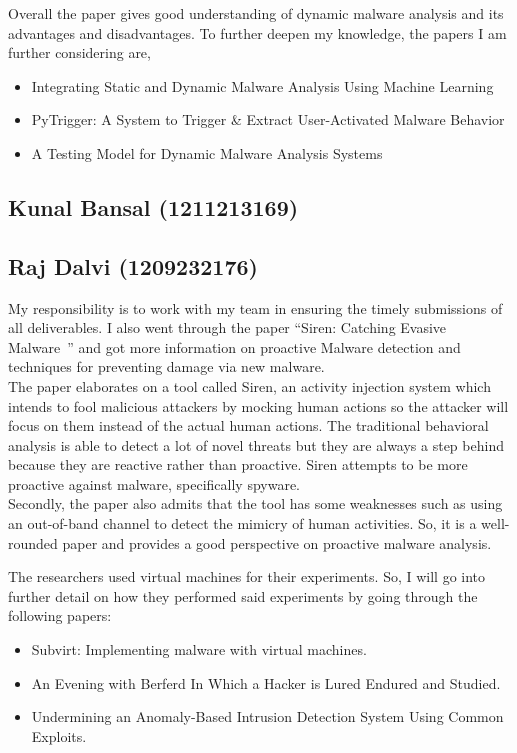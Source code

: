 \documentclass[16pt]{article}
\begin{document}
		Overall the paper gives good understanding of dynamic malware analysis and its advantages and disadvantages. To further deepen my knowledge, the papers I am further considering are,
		\begin{itemize}
			\item Integrating Static and Dynamic Malware Analysis Using Machine Learning~\cite{mangialardo2015integrating}
			\item PyTrigger: A System to Trigger \& Extract User-Activated Malware Behavior~\cite{fleck2013pytrigger}
			\item A Testing Model for Dynamic Malware Analysis Systems~\cite{massicotte2012testing}
		\end{itemize}
		
		\subsection{Kunal Bansal (1211213169)}
		\subsection{Raj Dalvi (1209232176)}
		My responsibility is to work with my team in ensuring the timely submissions of all deliverables. I also went through the paper “Siren: Catching Evasive Malware~\cite{borders2006siren}” and got more information on proactive Malware detection and techniques for preventing damage via new malware.\\
		The paper elaborates on a tool called Siren, an activity injection system which intends to fool malicious attackers by mocking human actions so the attacker will focus on them instead of the actual human actions. The traditional behavioral analysis is able to detect a lot of novel threats but they are always a step behind because they are reactive rather than proactive. Siren attempts to be more proactive against malware, specifically spyware.\\
		Secondly, the paper also admits that the tool has some weaknesses such as using an out-of-band channel to detect the mimicry of human activities. So, it is a well-rounded paper and provides a good perspective on proactive malware analysis.
		
		The researchers used virtual machines for their experiments. So, I will go into further detail on how they performed said experiments by going through the following papers:
		\begin{itemize}
			\item Subvirt: Implementing malware with virtual machines.~\cite{king2006subvirt}
			\item An Evening with Berferd In Which a Hacker is Lured Endured and Studied.~\cite{cheswick1992evening}
			\item Undermining an Anomaly-Based Intrusion Detection System Using Common Exploits.~\cite{tan2002undermining}
		\end{itemize}
		
\end{document}
